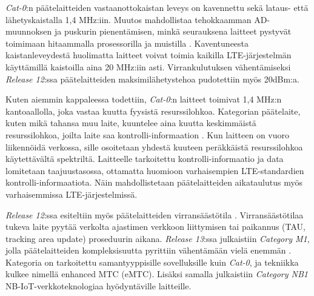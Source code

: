 \documentclass[finnish,12pt,a4paper,pdftex]{article}
\begin{document}
 \textit{Cat-0}:n päätelaitteiden vastaanottokaistan leveys on kavennettu sekä lataus- että lähetyskaistalla 1,4 MHz:iin. Muutos mahdollistaa tehokkaamman AD-muunnoksen ja puskurin pienentämisen, minkä seurauksena laitteet pystyvät toimimaan hitaammalla prosessorilla ja muistilla \cite{nokiawhitepaper}. Kaventuneesta kaistanleveydestä huolimatta laitteet voivat toimia kaikilla LTE-järjestelmän käyttämillä kaistoilla aina 20 MHz:iin asti. Virrankulutuksen vähentämiseksi \textit{Release 12}:ssa päätelaitteiden maksimilähetystehoa pudotettiin myös 20dBm:a.

Kuten aiemmin kappaleessa todettiin, \textit{Cat-0}:n laitteet toimivat 1,4 MHz:n kantoaallolla, joka vastaa kuutta fyysistä resurssilohkoa. Kategorian päätelaite, kuten mikä tahansa muu laite, kuuntelee aina kuutta keskimmäistä resurssilohkoa, joilta laite saa kontrolli-informaation \cite{nokiawhitepaper}. Kun laitteen on vuoro liikennöidä verkossa, sille osoitetaan yhdestä kuuteen peräkkäistä resurssilohkoa käytettävältä spektriltä. Laitteelle tarkoitettu kontrolli-informaatio ja data lomitetaan taajuustasossa, ottamatta huomioon varhaisempien LTE-standardien kontrolli-informaatiota. Näin mahdollistetaan päätelaitteiden aikataulutus myös varhaisemmissa LTE-järjestelmissä.

\textit{Release 12}:ssa esiteltiin myös päätelaitteiden virransäästötila \cite{nokiawhitepaper}. Virransäästötilaa tukeva laite pyytää verkolta ajastimen verkkoon liittymisen tai paikannus (TAU, tracking area update) proseduurin aikana. \textit{Release 13}:ssa \cite{release13} julkaistiin \textit{Category M1}, jolla päätelaitteiden kompleksisuutta pyrittiin vähentämään vielä enemmän \cite{gsmawhitepaper}. Kategoria on tarkoitettu samantyyppisille sovelluksille kuin \textit{Cat-0}, ja tekniikka kulkee nimellä enhanced MTC (eMTC). Lisäksi samalla julkaistiin \textit{Category NB1} NB-IoT-verkkoteknologiaa hyödyntäville laitteille. 
\end{document}
